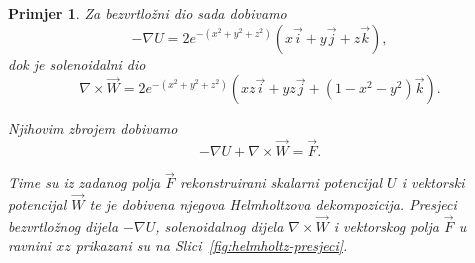 \documentclass[12pt,a4paper]{article}
\newtheorem{pr}[tm]{Primjer}
\begin{document}
\begin{pr}
Za bezvrtložni dio sada dobivamo
\[
-\nabla U
=
2e^{-(x^2+y^2+z^2)}
\left(
x\overrightarrow{i}
+y\overrightarrow{j}
+z\overrightarrow{k}
\right),
\]
dok je solenoidalni dio
\[
\nabla\times\overrightarrow{W}
=
2e^{-(x^2+y^2+z^2)}
\left(
xz\overrightarrow{i}
+yz\overrightarrow{j}
+(1-x^2-y^2)\overrightarrow{k}
\right).
\]

Njihovim zbrojem dobivamo
\[
-\nabla U+\nabla\times\overrightarrow{W}
=
\overrightarrow{F}.
\]

Time su iz zadanog polja $\overrightarrow{F}$ rekonstruirani skalarni
potencijal $U$ i vektorski potencijal $\overrightarrow{W}$ te je dobivena
njegova Helmholtzova dekompozicija. Presjeci bezvrtložnog dijela
$-\nabla U$, solenoidalnog dijela
$\nabla\times\overrightarrow{W}$ i vektorskog polja
$\overrightarrow{F}$ u ravnini $xz$ prikazani su na
Slici~\ref{fig:helmholtz-presjeci}.

\begin{figure}[H]
\centering


\def\pivot{0.5}

\def\polje#1#2#3#4{%
\resizebox{0.318\textwidth}{!}{%
\begin{tikzpicture}
\begin{axis}[
    width=6cm, height=6cm,
    xmin=-3.1, xmax=3.1, ymin=-3.1, ymax=3.1,
    axis equal image, enlargelimits=false, clip=false,
    axis lines=middle,
    axis line style={->, >={Latex[length=1.8mm,width=1.2mm]},
                     line width=0.55pt, black!65},
    xtick={-3,-2,...,3}, ytick={-3,-2,...,3},
    xticklabels={}, yticklabels={},
    tick style={black!45, line width=0.4pt},
    grid=major, grid style={line width=0.2pt, draw=gray!22},
    title={#4}, title style={font=\small, yshift=-0.5mm}
]

\foreach \ix in {-6,...,6}{
  \foreach \iz in {-6,...,6}{
    \pgfmathsetmacro{\x}{\ix/2}
    \pgfmathsetmacro{\z}{\iz/2}
    \pgfmathsetmacro{\E}{exp(-(\x*\x+\z*\z))}
    \pgfmathsetmacro{\Dx}{#2}
    \pgfmathsetmacro{\Dz}{#3}
    \pgfmathsetmacro{\Q}{sqrt(\Dx*\Dx+\Dz*\Dz)}
    \pgfmathsetmacro{\Nm}{2*\E*\Q}

    \ifdim\Q pt>0.001pt
      \pgfmathsetmacro{\L}{0.27+0.19*\Nm/(0.25+\Nm)}
      \pgfmathsetmacro{\mix}{32+68*min(1,\Nm/1.2)}
      \pgfmathsetmacro{\lw}{0.5+0.4*min(1,\Nm/1.2)}
      \pgfmathsetmacro{\Ux}{\L*\Dx/\Q}
      \pgfmathsetmacro{\Uz}{\L*\Dz/\Q}
      \pgfmathsetmacro{\Xa}{\x-\pivot*\Ux}
      \pgfmathsetmacro{\Za}{\z-\pivot*\Uz}
      \pgfmathsetmacro{\Xb}{\x+(1-\pivot)*\Ux}
      \pgfmathsetmacro{\Zb}{\z+(1-\pivot)*\Uz}
      \edef\temp{\noexpand\draw[-{Latex[length=1.15mm,width=0.85mm]},
            color=#1!\mix!white, line width=\lw pt]
        (axis cs:\Xa,\Za) -- (axis cs:\Xb,\Zb);}%
      \temp
    \else
      \edef\temp{\noexpand\draw[color=#1, fill=white, line width=0.6pt]
        (axis cs:\x,\z) circle (1.7pt);}%
      \temp
    \fi
  }
}


\end{axis}
\end{tikzpicture}}}
\end{figure}
\end{pr}
\end{document}
